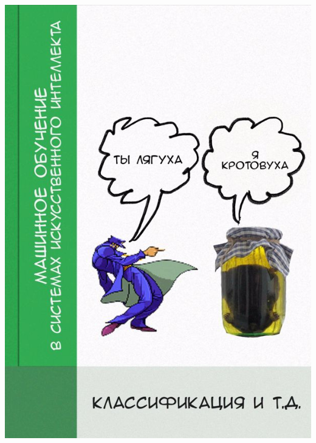 \documentclass[
    14pt,
    a4paper,
    oneside,
    openany,
    draft
]{extreport}
\begin{document}




\nocite{*}

\begin{titlepage}
    \includegraphics[]{figures/titlepage.jpg}
\end{titlepage}

\tableofcontents



\end{document}
